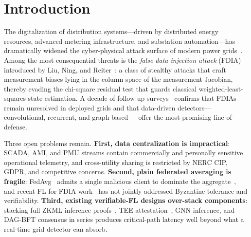 \documentclass[conference]{IEEEtran}
\begin{document}
\section{Introduction}
The digitalization of distribution systems---driven by distributed energy resources, advanced metering infrastructure, and substation automation---has dramatically widened the cyber-physical attack surface of modern power grids~\cite{nistir7628r1,achaal2024sgsurvey}. Among the most consequential threats is the \emph{false data injection attack} (FDIA) introduced by Liu, Ning, and Reiter~\cite{liu2009false,liu2011false}: a class of stealthy attacks that craft measurement biases lying in the column space of the measurement Jacobian, thereby evading the chi-square residual test that guards classical weighted-least-squares state estimation. A decade of follow-up surveys~\cite{deng2017fdia,musleh2020survey,reda2022comprehensive,irfan2024survey} confirms that FDIAs remain unresolved in deployed grids and that data-driven detectors---convolutional, recurrent, and graph-based~\cite{he2017realtime,niu2019dynamic,mukherjee2022deep,yin2022powerfdnet,boyaci2022gnn,boyaci2022joint,takiddin2023generalized}---offer the most promising line of defense.

Three open problems remain. \textbf{First, data centralization is impractical}: SCADA, AMI, and PMU streams contain commercially and personally sensitive operational telemetry, and cross-utility sharing is restricted by NERC CIP, GDPR, and competitive concerns. \textbf{Second, plain federated averaging is fragile}: FedAvg~\cite{mcmahan2017communication} admits a single malicious client to dominate the aggregate~\cite{blanchard2017krum,fang2020local,bagdasaryan2020backdoor}, and recent FL-for-FDIA work~\cite{li2022securefl,tran2023crosssilo,uddin2024edge} has not jointly addressed Byzantine tolerance and verifiability. \textbf{Third, existing verifiable-FL designs over-stack components}: stacking full ZKML inference proofs~\cite{liu2021zkcnn,feng2021zen,kang2022scaling}, TEE attestation~\cite{costan2016sgx,tsai2017graphenesgx,tramer2019slalom}, GNN inference, and DAG-BFT consensus in series produces critical-path latency well beyond what a real-time grid detector can absorb.
\end{document}
